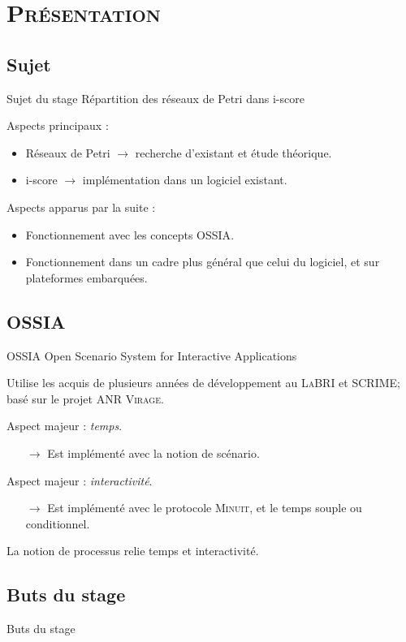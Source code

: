 \section{\scshape Présentation}
\subsection{Sujet}
\begin{frame}{Sujet du stage}
	{\large Répartition des réseaux de Petri dans i-score}
	
	Aspects principaux : 
	\begin{itemize}
		\item Réseaux de Petri $\rightarrow$ recherche d'existant et étude théorique.
		\item i-score $\rightarrow$ implémentation dans un logiciel existant.
	\end{itemize} 
	\vspace{1em}
	Aspects apparus par la suite : 
	\begin{itemize}
		\item Fonctionnement avec les concepts {OSSIA}.
		\item Fonctionnement dans un cadre plus général que celui du logiciel, et sur plateformes embarquées.
	\end{itemize}
	
\end{frame}

\subsection{OSSIA}
\begin{frame}{OSSIA}
	{\large Open Scenario System for Interactive Applications}
	
	Utilise les acquis de plusieurs années de développement au \textsc{LaBRI} et \textsc{SCRIME}; basé sur le projet \textsc{ANR Virage}.
	
	\vspace{1em}
	Aspect majeur : \emph{temps}.
	\begin{itemize}
		\item[$\rightarrow$] Est implémenté avec la notion de scénario.
	\end{itemize}
	
	Aspect majeur : \emph{interactivité}.
		\begin{itemize}
			\item[$\rightarrow$] Est implémenté avec le protocole \textsc{Minuit}, et le temps souple ou conditionnel.
		\end{itemize}
		
	La notion de processus relie temps et interactivité.
\end{frame}

\subsection{Buts du stage}
\begin{frame}{Buts du stage}

\end{frame}

